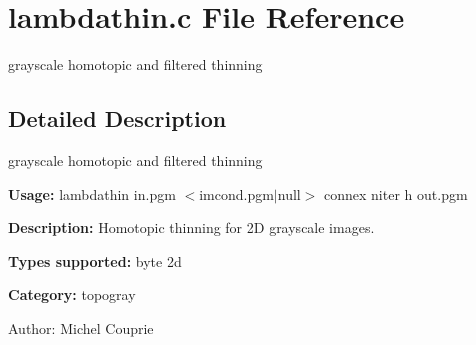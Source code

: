 \section{lambdathin.c File Reference}
\label{lambdathin_8c}
grayscale homotopic and filtered thinning 



\subsection{Detailed Description}
grayscale homotopic and filtered thinning 

{\bf Usage:} lambdathin in.pgm $<$imcond.pgm$|$null$>$ connex niter h out.pgm

{\bf Description:} Homotopic thinning for 2D grayscale images.

{\bf Types supported:} byte 2d

{\bf Category:} topogray

\begin{Desc}
\item[Author:]Michel Couprie \end{Desc}
